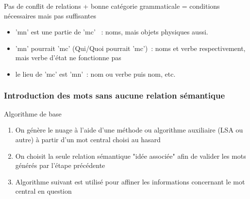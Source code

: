 \documentclass{beamer}
\begin{document}
\begin{frame}
\begin{block}{}
  Pas de conflit de relations + bonne catégorie grammaticale = conditions nécessaires mais pas suffisantes 
  \begin{itemize}
  \item 'mn' est une partie de 'mc'~ : noms, mais objets physiques aussi. 
  \item 'mn' pourrait 'mc' (Qui/Quoi pourrait 'mc')~: noms et verbe respectivement, mais verbe d'état ne fonctionne pas
  \item le lieu de 'mc' est 'mn'~: nom ou verbe puis nom, etc.
  \end{itemize}
  \end{block} 
\end{frame}


\begin{frame}
\frametitle{Introduction des mots sans aucune relation sémantique}
  \begin{block}{Algorithme de base} 
  \begin{enumerate}
  \item On génère le nuage à l'aide d'une méthode ou algorithme auxiliaire (LSA ou autre) à partir d'un mot central choisi au hasard
  \item On choisit la seule relation sémantique "idée associée" afin de valider les mots générés par l'étape précédente
  \item Algorithme suivant est utilisé pour affiner les informations concernant le mot central en question
  \end{enumerate} 
  \end{block}
\end{frame}
\end{document}
